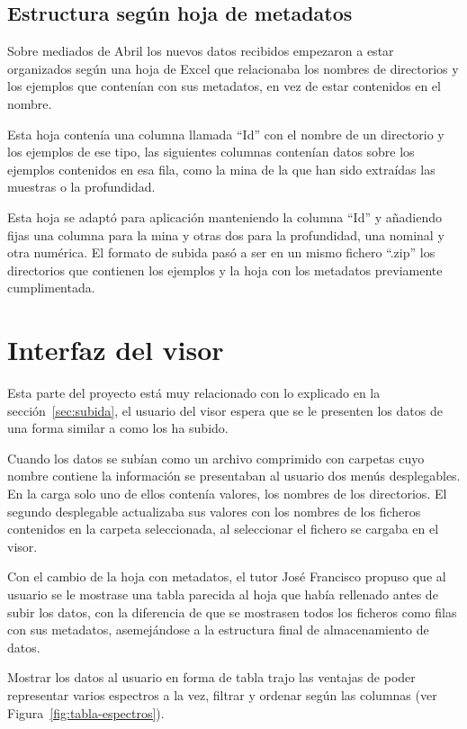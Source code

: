 \subsection{Estructura según hoja de metadatos}\label{sec:excel}

Sobre mediados de Abril los nuevos datos recibidos empezaron a estar organizados
según una hoja de Excel que relacionaba los nombres de directorios y los
ejemplos que contenían con sus metadatos, en vez de estar contenidos en el
nombre.

Esta hoja contenía una columna llamada ``Id'' con el nombre de un directorio y
los ejemplos de ese tipo, las siguientes columnas contenían datos sobre los
ejemplos contenidos en esa fila, como la mina de la que han sido extraídas las
muestras o la profundidad.

Esta hoja se adaptó para aplicación manteniendo la columna ``Id'' y añadiendo
fijas una columna para la mina y otras dos para la profundidad, una nominal y
otra numérica. El formato de subida pasó a ser en un mismo fichero ``.zip'' los
directorios que contienen los ejemplos y la hoja con los metadatos previamente
cumplimentada.

\section{Interfaz del visor}

Esta parte del proyecto está muy relacionado con lo explicado en la
sección~\ref{sec:subida}, el usuario del visor espera que se le presenten los
datos de una forma similar a como los ha subido.

Cuando los datos se subían como un archivo comprimido con carpetas cuyo nombre
contiene la información se presentaban al usuario dos menús desplegables. En la
carga solo uno de ellos contenía valores, los nombres de los directorios. El
segundo desplegable actualizaba sus valores con los nombres de los ficheros
contenidos en la carpeta seleccionada, al seleccionar el fichero se cargaba en
el visor.

Con el cambio de la hoja con metadatos, el tutor José Francisco propuso que al
usuario se le mostrase una tabla parecida al hoja que había rellenado antes de
subir los datos, con la diferencia de que se mostrasen todos los ficheros como
filas con sus metadatos, asemejándose a la estructura final de almacenamiento de
datos.

Mostrar los datos al usuario en forma de tabla trajo las ventajas de poder
representar varios espectros a la vez, filtrar y ordenar según las columnas (ver
Figura~\ref{fig:tabla-espectros}).

